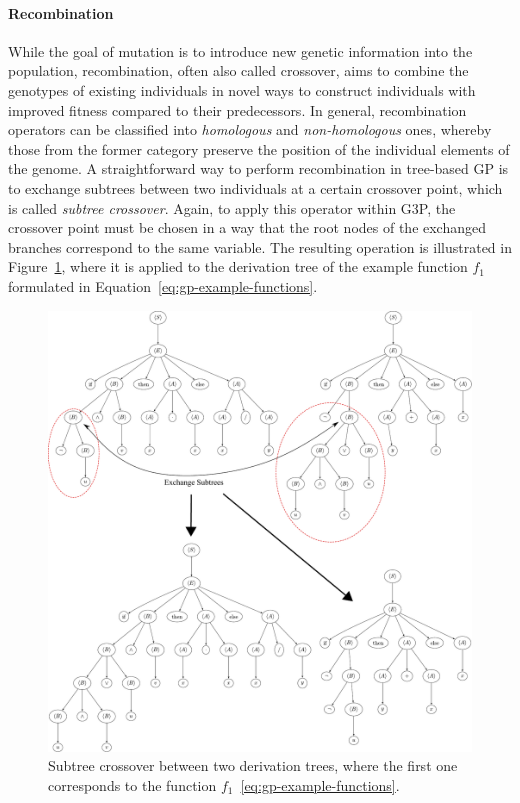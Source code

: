 \paragraph{Recombination}
While the goal of mutation is to introduce new genetic information into the population, recombination, often also called crossover, aims to combine the genotypes of existing individuals in novel ways to construct individuals with improved fitness compared to their predecessors.
In general, recombination operators can be classified into \emph{homologous} and \emph{non-homologous} ones, whereby those from the former category preserve the position of the individual elements of the genome.
A straightforward way to perform recombination in tree-based GP is to exchange subtrees between two individuals at a certain crossover point, which is called \emph{subtree crossover}.
Again, to apply this operator within G3P, the crossover point must be chosen in a way that the root nodes of the exchanged branches correspond to the same variable.
The resulting operation is illustrated in Figure~\ref{fig:gp-subtree-crossover}, where it is applied to the derivation tree of the example function $f_1$ formulated in Equation~\eqref{eq:gp-example-functions}.  
\begin{figure}
    \centering
	\includegraphics[scale=0.46]{figures/trees/subtree_crossover.pdf}
	\caption{Subtree crossover between two derivation trees, where the first one corresponds to the function $f_1$~\eqref{eq:gp-example-functions}.}
	\label{fig:gp-subtree-crossover}
\end{figure}
